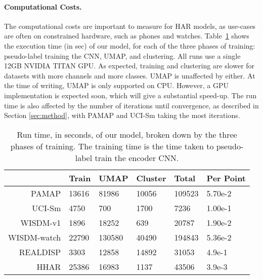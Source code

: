 \documentclass[wcp]{jmlr}
\begin{document}
\paragraph{Computational Costs.}
The computational costs are important to measure for HAR models, as use-cases are often on constrained hardware, such as phones and watches. Table~\ref{tab:run-time} shows the execution time (in sec) of our model, for each of the three phases of training: pseudo-label training the CNN, UMAP, and clustering. All runs use a single 12GB NVIDIA TITAN GPU. As expected, training and clustering are slower for datasets with more channels and more classes. UMAP is unaffected by either. At the time of writing, UMAP is only supported on CPU. However, a GPU implementation is expected soon, which will give a substantial speed-up. The run time is also affected by the number of iterations until convergence, as described in Section \ref{sec:method}, with PAMAP and UCI-Sm taking the most iterations.

\begin{table}[t]
    \caption{Run time, in seconds, of our model, broken down by the three phases of training. The training time is the time taken to pseudo-label train the encoder CNN.\vspace*{-0ex}} \label{tab:run-time}
    \centering
    \small
    \begin{tabular}{|r|p{.9cm}|p{.9cm}|p{.9cm}|p{.9cm}|p{1.1cm}|}
                        \hline
                        & Train         & UMAP      & Cluster       & Total         & Per Point                \\
                        \hline \hline
         PAMAP          & 13616         & 81986     & 10056         & 109523        & 5.70e-2                       \\
                        \hline
         UCI-Sm            & 4750          & 700       & 1700          & 7236          & 1.00e-1                       \\
                        \hline
         WISDM-v1       & 1896          & 18252     & 639          & 20787         & 1.90e-2                       \\
                        \hline
         WISDM-watch    & 22790         & 130580    & 40490         & 194843        & 5.36e-2                       \\
                        \hline
         REALDISP       & 3303         & 12858     & 14892         & 31053        & 4.9e-1                        \\
                        \hline
         HHAR       & 25386         & 16983     & 1137         & 43506        & 3.9e-3                        \\
                        \hline
    \end{tabular}
    \end{table}
\end{document}
